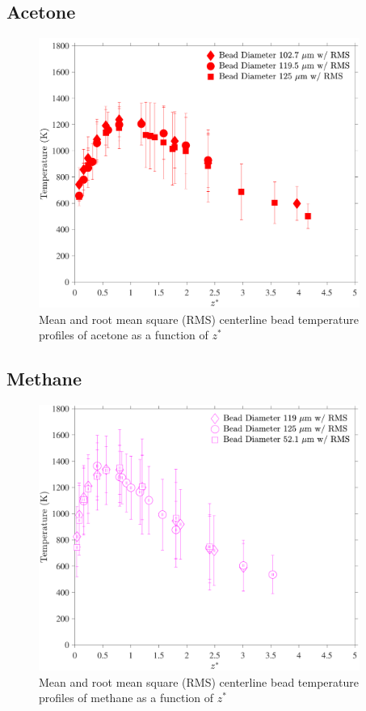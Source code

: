 \documentclass[12pt]{article}
\begin{document}
\pagebreak

\subsection{Acetone}
\label{ssec:Acetone_Bead_Temp}
\begin{figure}[!h]
	\centering
\includegraphics[width=10.5cm,keepaspectratio]{Acetone_Bead_Temperature.pdf}
	\caption[Mean and RMS centerline bead temperature profile of acetonel]{Mean and root mean square (RMS) centerline bead temperature profiles of acetone as a function of $z^*$}
	\label{fig:Acetone_Bead_Temp}
\end{figure}

\pagebreak

\subsection{Methane}
\label{ssec:Methane_Bead_Temp}
\begin{figure}[!h]
	\centering
\includegraphics[width=10.5cm,keepaspectratio]{Methane_Bead_Temperature.pdf}
	\caption[Mean and RMS centerline bead temperature profile of methane]{Mean and root mean square (RMS) centerline bead temperature profiles of methane as a function of $z^*$}
	\label{fig:Methane_Bead_Temp}
\end{figure}
\end{document}
